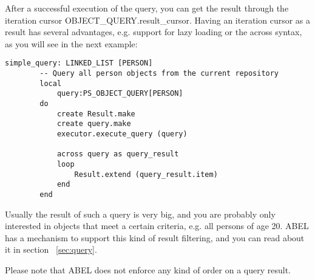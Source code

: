 After a successful execution of the query, you can get the result through the iteration cursor OBJECT\_QUERY.result\_cursor.
Having an iteration cursor as a result has several advantages, e.g. support for lazy loading or the across syntax, as you will see in the next example:

\begin{lstlisting}[language=OOSC2Eiffel, captionpos=b, caption={}, label={lst:simple_query}]
	simple_query: LINKED_LIST [PERSON]
		-- Query all person objects from the current repository
		local
			query:PS_OBJECT_QUERY[PERSON]
		do
			create Result.make
			create query.make
			executor.execute_query (query)

			across query as	query_result
			loop
				Result.extend (query_result.item)
			end
		end
\end{lstlisting}

Usually the result of such a query is very big, and you are probably only interested in objects that meet a certain criteria, e.g. all persons of age 20.
ABEL has a mechanism to support this kind of result filtering, and you can read about it in section ~\ref{sec:query}.

Please note that ABEL does not enforce any kind of order on a query result.

\begin{comment}
ABEL can also filter the query results in advance so you only get a result set that meets certain criteria: 

\begin{lstlisting}[language=OOSC2Eiffel, captionpos=b, caption={}, label={lst:simple_filtered_query}]
	simple_filtered_query (name:STRING; age:INTEGER): detachable PERSON
		-- Query a person object from the current repository
		local
			query:PS_OBJECT_QUERY[PERSON]
			criterion:PS_PREDEFINED_CRITERION
		do
			create query.make
			create criterion.make ("last_name", "=", name)
			query.set_criterion (criterion)

			from
				executor.execute_query (query)
			until 
				query.result_cursor.after
			loop
				if query.result_cursor.item.age = age then 
					Result:= query.result_cursor.item
				end
			end
		end
\end{lstlisting}

This is just a very simple example for a query with a certain criterion.
ABEL has a powerful mechanism that also supports a logical combinations of multiple criteria, or using agents for filtering.
You can read more about criteria in section XY.

\end{comment}

